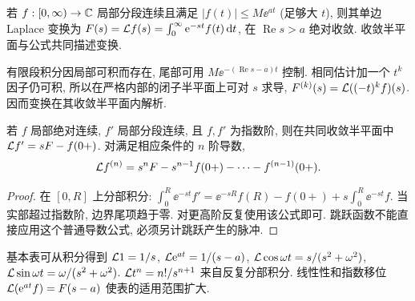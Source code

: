 \begin{definition}
若 $f:[0,\infty)\to\mathbb C$ 局部分段连续且满足 $|f(t)|\le M\ee^{at}$ (足够大 $t$), 则其单边 Laplace 变换为 $F(s)=\mathcal L f(s)=\int_0^\infty\mathrm e^{-st}f(t)\,\mathrm d t$, 在 $\operatorname{Re}s>a$ 绝对收敛. 收敛半平面与公式共同描述变换.
\end{definition}
有限段积分因局部可积而存在, 尾部可用 $M\ee^{-(\operatorname{Re}s-a)t}$ 控制. 相同估计加一个 $t^k$ 因子仍可积, 所以在严格内部的闭子半平面上可对 $s$ 求导, $F^{(k)}(s)=\mathcal L((-t)^kf)(s)$. 因而变换在其收敛半平面内解析.
\begin{proposition}
若 $f$ 局部绝对连续, $f'$ 局部分段连续, 且 $f,f'$ 为指数阶, 则在共同收敛半平面中 $\mathcal L f'=sF-f(0+)$. 对满足相应条件的 $n$ 阶导数,
\[
\mathcal L f^{(n)}=s^nF-s^{n-1}f(0+)-\cdots-f^{(n-1)}(0+).
\]
\end{proposition}
\begin{proof}
在 $[0,R]$ 上分部积分: $\int_0^R\ee^{-st}f' =\ee^{-sR}f(R)-f(0+)+s\int_0^R\ee^{-st}f$. 当实部超过指数阶, 边界尾项趋于零. 对更高阶反复使用该公式即可. 跳跃函数不能直接应用这个普通导数公式, 必须另计跳跃产生的脉冲.
\end{proof}
基本表可从积分得到 $\mathcal L1=1/s$, $\mathcal L\mathrm e^{at}=1/(s-a)$, $\mathcal L\cos\omega t=s/(s^2+\omega^2)$, $\mathcal L\sin\omega t=\omega/(s^2+\omega^2)$. $\mathcal L t^n=n!/s^{n+1}$ 来自反复分部积分. 线性性和指数移位 $\mathcal L(\mathrm e^{at}f)=F(s-a)$ 使表的适用范围扩大.

